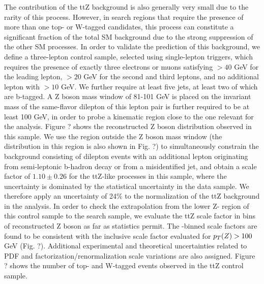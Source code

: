 

The contribution of the ttZ background is also generally very small due to the rarity of this process. However, in search regions that require the presence of more than one top- or W-tagged candidates, this process can constitute a significant fraction of the total SM background due to the strong suppression of the other SM processes. In order to validate the prediction of this background, we define a three-lepton control sample, selected using single-lepton triggers, which requires the presence of exactly three electrons or muons satisfying \pt$>40$ GeV for the leading lepton, \pt$>20$ GeV for the second and third leptons, and no additional lepton with \pt$>10$ GeV. We further require at least five jets, at least two of which are b-tagged. A Z boson mass window of 81-101 GeV is placed on the invariant mass of the same-flavor dilepton \pt{} of this lepton pair is further required to be at least 100 GeV, in order to probe a kinematic region close to the one relevant for the analysis. Figure ? shows the reconstructed Z boson \pt{} distribution observed in this sample. We use the region outside the Z boson mass window (the \met{} distribution in this region is also shown in Fig. ?) to simultaneously constrain the \ttbar{} background consisting of dilepton \ttbar{} events with an additional lepton originating from semi-leptonic b-hadron decay or from a misidentified jet, and obtain a scale factor of $1.10\pm0.26$ for the ttZ-like processes in this sample, where the uncertainty is dominated by the statistical uncertainty in the data sample. We therefore apply an uncertainty of 24\% to the normalization of the ttZ background in the analysis. In order to check the extrapolation from the lower Z-\pt{} region of this control sample to the search sample, we evaluate the ttZ scale factor in bins of reconstructed Z boson \pt{} as far as statistics permit. The \pt-binned scale factors are found to be consistent with the inclusive scale factor evaluated for $p_{T}(Z)>100$ GeV (Fig. ?). Additional experimental and theoretical uncertainties related to PDF and factorization/renormalization scale variations are also assigned. Figure ? shows the number of top- and W-tagged events observed in the ttZ control sample. 


